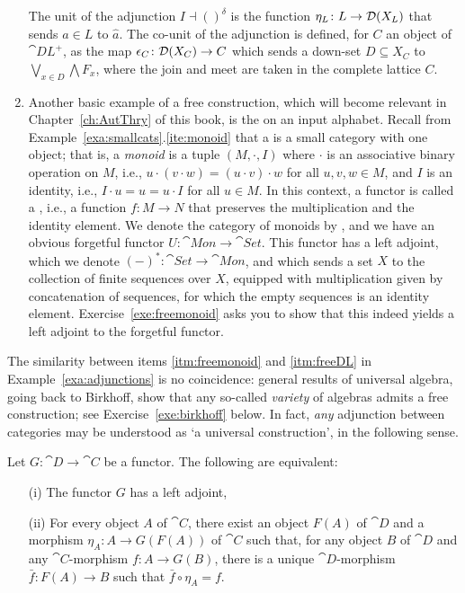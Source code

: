 \begin{example}
\begin{enumerate}
  The unit of the adjunction $I \dashv ()^\delta$ is the function $\eta_L \colon L \to \mathcal{D}(X_L)$ that sends $a \in L$ to $\hat{a}$. The co-unit of the adjunction is defined, for $C$ an object of $\cat{DL}^+$, as the map $\epsilon_C \colon \mathcal{D}(X_C) \to C$ which sends a down-set $D \subseteq X_C$ to $\bigvee_{x \in D} \bigwedge F_x$, where the join and meet are taken in the complete lattice $C$.
\item \label{itm:freemonoid} Another basic example of a free construction, which will become relevant in Chapter~\ref{ch:AutThry} of this book, is the  on an input alphabet. Recall from Example~\ref{exa:smallcats}.\ref{ite:monoid} that a  is a small category with one object; that is, a \emph{monoid} is a tuple $(M, \cdot, I)$ where $\cdot$ is an associative binary operation on $M$, i.e., $u \cdot (v \cdot w) = (u \cdot v) \cdot w$ for all $u, v, w \in M$, and $I$ is an identity, i.e., $I \cdot u = u = u \cdot I$ for all $u \in M$. In this context, a functor is called a , i.e., a function $f \colon M \to N$ that preserves the multiplication and the identity element. We denote the category of monoids by , and we have an obvious forgetful functor $U \colon \cat{Mon} \to \cat{Set}$. This functor has a left adjoint, which we denote $(-)^* \colon \cat{Set} \to \cat{Mon}$, and which sends a set $X$ to the collection of finite sequences over $X$, equipped with multiplication given by concatenation of sequences, for which the empty sequences is an identity element. Exercise~\ref{exe:freemonoid} asks you to show that this indeed yields a left adjoint to the forgetful functor.
  \end{enumerate}
\end{example}
The similarity between items \ref{itm:freemonoid} and \ref{itm:freeDL} in Example~\ref{exa:adjunctions} is no coincidence: general results of universal algebra, going back to Birkhoff, show that any so-called \emph{variety} of algebras admits a free construction; see Exercise~\ref{exe:birkhoff} below. In fact, \emph{any} adjunction between categories may be understood as `a universal construction', in the following sense.
\begin{theorem}\label{thm:adj-universal-arrow}
Let $G \colon \cat{D} \to \cat{C}$ be a functor. The following are equivalent:
\begin{enumerate}
  \item[(i)] The functor $G$ has a left adjoint,
  \item[(ii)] For every object $A$ of $\cat{C}$, there exist an object $F(A)$ of $\cat{D}$ and a morphism $\eta_A \colon A \to G(F(A))$ of $\cat{C}$ such that, for any object $B$ of $\cat{D}$ and any $\cat{C}$-morphism $f \colon A \to G(B)$, there is a unique $\cat{D}$-morphism $\bar{f} \colon F(A) \to B$ such that $\bar{f} \circ \eta_A = f$.
\end{enumerate}
\end{theorem}
